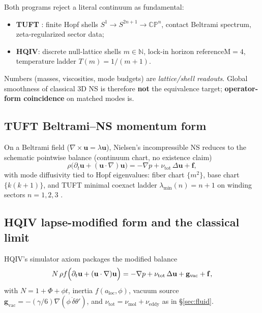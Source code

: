 \documentclass[11pt]{amsart}
\begin{document}
Both programs reject a literal continuum as fundamental:
\begin{itemize}[leftmargin=2em]
\item \textbf{TUFT} \cite{NielsenTUFT2026}: finite Hopf shells $S^1\to S^{2n+1}\to\mathbb{CP}^n$,
  contact Beltrami spectrum, zeta-regularized sector data;
\item \textbf{HQIV}: discrete null-lattice shells $m\in\mathbb{N}$, lock-in horizon
  $\mathrm{referenceM}=4$, temperature ladder $T(m)=1/(m+1)$.
\end{itemize}
Numbers (masses, viscosities, mode budgets) are \emph{lattice/shell readouts}. Global smoothness of
classical 3D NS is therefore \textbf{not} the equivalence target; \textbf{operator-form coincidence}
on matched modes is.

\subsection{TUFT Beltrami--NS momentum form}

On a Beltrami field ($\nabla\times\mathbf u=\lambda\mathbf u$), Nielsen's incompressible NS
reduces to the schematic pointwise balance (continuum chart, no existence claim)
\begin{equation}
  \rho\bigl(\partial_t\mathbf u+(\mathbf u\cdot\nabla)\mathbf u\bigr)
  =-\nabla p+\nu_{\mathrm{tot}}\,\Delta\mathbf u+\mathbf f,
  \label{eq:tuft-beltrami-ns}
\end{equation}
with mode diffusivity tied to Hopf eigenvalues: fiber chart $\{m^2\}$, base chart $\{k(k+1)\}$, and
TUFT minimal coexact ladder $\lambda_{\min}(n)=n+1$ on winding sectors $n=1,2,3$
\cite{NielsenTUFT2026,hqiv-tuft-bridge-paper}.

\subsection{HQIV lapse-modified form and the classical limit}

HQIV's simulator axiom packages the modified balance \cite{hqiv-oct-action-paper}
\begin{equation}
  N\,\rho f\Bigl(\partial_t\mathbf u+(\mathbf u\cdot\nabla)\mathbf u\Bigr)
  =-\nabla p+\nu_{\mathrm{tot}}\,\Delta\mathbf u+\mathbf g_{\mathrm{vac}}+\mathbf f,
  \label{eq:hqiv-lapse-rans}
\end{equation}
with $N=1+\Phi+\phi t$, inertia $f(a_{\mathrm{loc}},\phi)$, vacuum source
$\mathbf g_{\mathrm{vac}}=-(\gamma/6)\nabla(\phi\,\dot\delta\theta')$, and
$\nu_{\mathrm{tot}}=\nu_{\mathrm{mol}}+\nu_{\mathrm{eddy}}$ as in \S\ref{sec:fluid}.
\end{document}
